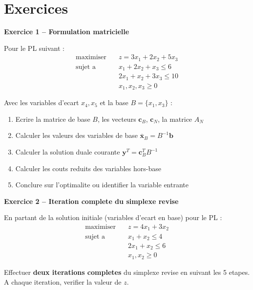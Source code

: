 \documentclass[12pt,a4paper]{article}
\begin{document}
\newpage
\section{Exercices}

\begin{exemple}
\textbf{Exercice 1 -- Formulation matricielle}

Pour le PL suivant :
\begin{align*}
\text{maximiser} \quad & z = 3x_1 + 2x_2 + 5x_3\\
\text{sujet a} \quad & x_1 + 2x_2 + x_3 \leq 6\\
& 2x_1 + x_2 + 3x_3 \leq 10\\
& x_1, x_2, x_3 \geq 0
\end{align*}

Avec les variables d'ecart $x_4, x_5$ et la base $B = \{x_1, x_3\}$ :

\begin{enumerate}
    \item Ecrire la matrice de base $B$, les vecteurs $\mathbf{c}_B$, $\mathbf{c}_N$, la matrice $A_N$
    \item Calculer les valeurs des variables de base $\bar{\mathbf{x}}_B = B^{-1}\mathbf{b}$
    \item Calculer la solution duale courante $\mathbf{y}^T = \mathbf{c}_B^T B^{-1}$
    \item Calculer les couts reduits des variables hors-base
    \item Conclure sur l'optimalite ou identifier la variable entrante
\end{enumerate}
\end{exemple}

\begin{exemple}
\textbf{Exercice 2 -- Iteration complete du simplexe revise}

En partant de la solution initiale (variables d'ecart en base) pour le PL :
\begin{align*}
\text{maximiser} \quad & z = 4x_1 + 3x_2\\
\text{sujet a} \quad & x_1 + x_2 \leq 4\\
& 2x_1 + x_2 \leq 6\\
& x_1, x_2 \geq 0
\end{align*}

Effectuer \textbf{deux iterations completes} du simplexe revise en suivant les 5 etapes. A chaque iteration, verifier la valeur de $z$.
\end{exemple}
\end{document}
